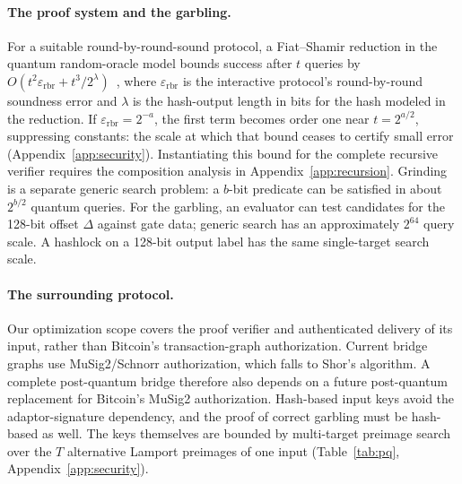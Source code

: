 \documentclass[11pt]{article}
\begin{document}
\paragraph{The proof system and the garbling.} For a suitable
round-by-round-sound protocol, a Fiat--Shamir reduction in the quantum
random-oracle model bounds success after $t$ queries by
$O(t^2\varepsilon_{\mathrm{rbr}}+t^3/2^{\lambda})$~\cite{cms19qrom},
where $\varepsilon_{\mathrm{rbr}}$ is the interactive protocol's
round-by-round soundness error and $\lambda$ is the hash-output length in
bits for the hash modeled in the reduction.
If $\varepsilon_{\mathrm{rbr}}=2^{-a}$, the first term becomes order one near
$t=2^{a/2}$, suppressing constants: the scale at which that bound ceases to
certify small error (Appendix~\ref{app:security}). Instantiating this bound for the complete recursive verifier requires the
composition analysis in Appendix~\ref{app:recursion}. Grinding is a separate
generic search
problem: a $b$-bit predicate can be satisfied in about $2^{b/2}$ quantum
queries. For the garbling, an evaluator can test candidates for the 128-bit
offset $\Delta$ against gate data; generic search has an approximately
$2^{64}$ query scale. A hashlock on a 128-bit output label has the same
single-target search scale.

\paragraph{The surrounding protocol.} Our optimization scope covers the proof
verifier and authenticated delivery of its input, rather than Bitcoin's
transaction-graph authorization. Current bridge graphs use MuSig2/Schnorr
authorization, which falls to Shor's algorithm. A complete post-quantum bridge
therefore also depends on a future post-quantum replacement for Bitcoin's
MuSig2 authorization. Hash-based input keys avoid the adaptor-signature
dependency, and the proof of correct garbling must be hash-based as well.
The keys themselves are bounded by multi-target preimage
search over the $T$ alternative Lamport preimages of one input
(Table~\ref{tab:pq}, Appendix~\ref{app:security}).
\end{document}
